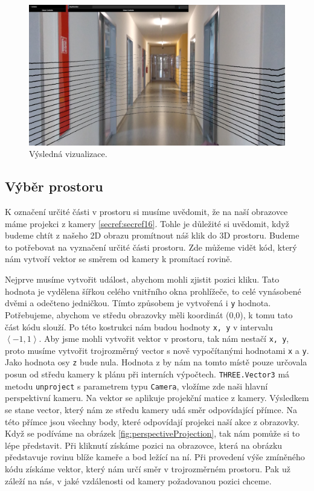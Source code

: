 \documentclass[czech,bachelor,dept420,male,cpdeclaration]{diploma}
\begin{document}
\begin{figure}[H]
\includegraphics[width=\linewidth]{Figures/sceneWithPoints.png}
\caption{Výsledná vizualizace.}
\label{fig:sceneWithPoints}
\end{figure}
	 

\subsection{Výběr prostoru}\label{secref:secref10}
K označení určité části v prostoru si musíme uvědomit, že na naší obrazovce máme projekci z kamery \ref{secref:secref16}. Tohle je důležité si uvědomit, když budeme chtít z našeho 2D obrazu promítnout náš klik do 3D prostoru. Budeme to potřebovat na vyznačení určité části prostoru. Zde můžeme vidět kód, který nám vytvoří vektor se směrem od kamery k promítací rovině.  



Nejprve musíme vytvořit událost, abychom mohli zjistit pozici kliku. Tato hodnota je vydělena šířkou celého vnitřního okna prohlížeče, to celé vynásobené dvěmi a odečteno jedničkou. Tímto způsobem je vytvořená i \texttt{y} hodnota. Potřebujeme, abychom ve středu obrazovky měli koordinát (0,0), k tomu tato část kódu slouží. Po této kostrukci nám budou hodnoty \texttt{x, y} v intervalu $\left\langle-1,1\right\rangle$. Aby jsme mohli vytvořit vektor v prostoru, tak nám nestačí \texttt{x, y}, proto musíme vytvořit trojrozměrný vector s nově vypočítanými hodnotami \texttt{x} a \texttt{y}. Jako hodnota osy \texttt{z} bude nula. Hodnota z by nám na tomto místě pouze určovala posun od středu kamery k plánu při interních výpočtech. \texttt{THREE.Vector3} má metodu \texttt{unproject} s parametrem typu \texttt{Camera}, vložíme zde naši hlavní perspektivní kameru. Na vektor se aplikuje projekční matice z kamery. Výsledkem se stane vector, který nám ze středu kamery udá směr odpovídající přímce. Na této přímce jsou všechny body, které odpovídají projekci naší akce z obrazovky. Když se podíváme na obrázek \ref{fig:perspectiveProjection}, tak nám pomůže si to lépe představit. Při kliknutí získáme pozici na obrazovce, která na obrázku představuje rovinu blíže kameře a bod ležící na ní. Při provedení výše zmíněného kódu získáme vektor, který nám určí směr v trojrozměrném prostoru. Pak už záleží na nás, v jaké vzdálenosti od kamery požadovanou pozici chceme.
\end{document}
